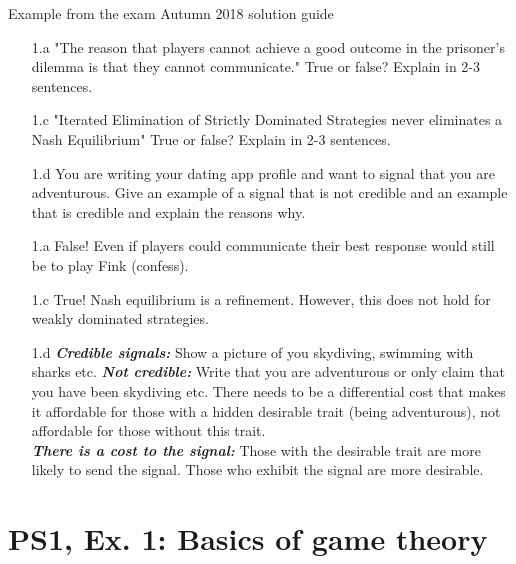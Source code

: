 \begin{frame}{Example from the exam Autumn 2018 solution guide}
\begin{multicols}{2}\color{lightgray}
  \begin{itemize}\color{lightgray}
    \item[\color{lightgray}1.a] "The reason that players cannot achieve a good outcome in the prisoner’s dilemma is that they cannot communicate." True or false? Explain in 2-3 sentences.
    \item[\color{lightgray}1.c] "Iterated Elimination of Strictly Dominated Strategies never eliminates a Nash Equilibrium" True or false? Explain in 2-3 sentences.
    \item[1.d] \color{black}You are writing your dating app profile and want to signal that you are adventurous. Give an example of a signal that is not credible and an example that is credible and explain the reasons why.
  \end{itemize}
\vfill\null \columnbreak
\begin{itemize}\color{lightgray}
  \item[\color{lightgray}1.a] False! Even if players could communicate their best response would still be to play Fink (confess).
  \item[\color{lightgray}1.c] True! Nash equilibrium is a refinement. However, this does not hold for
weakly dominated strategies.
  \item[1.d] \color{black}\textit{\textbf{Credible signals:}} Show a picture of you skydiving, swimming with
sharks etc. \textit{\textbf{Not credible:}} Write that you are adventurous or only claim that you
have been skydiving etc. There needs to be a differential cost that makes it affordable for those with a hidden desirable trait (being adventurous), not affordable for those without this trait.\\
\textit{\textbf{There is a cost to the signal:}} Those with the desirable trait are more likely to send the signal. Those who exhibit the signal are more desirable.
\end{itemize}
\end{multicols}
\end{frame}


\section{PS1, Ex. 1: Basics of game theory}


